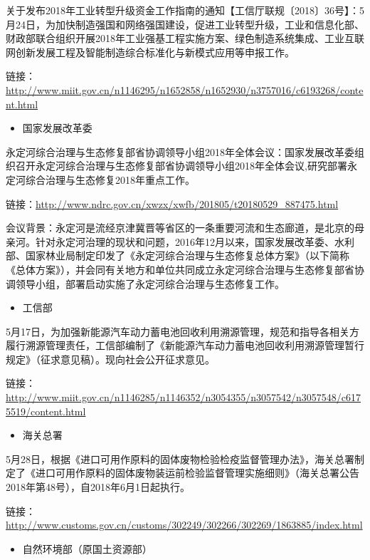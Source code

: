 \documentclass[]{book}
\providecommand{\tightlist}{%
  \setlength{\itemsep}{0pt}\setlength{\parskip}{0pt}}
\begin{document}
关于发布2018年工业转型升级资金工作指南的通知【工信厅联规〔2018〕36号】：5月24日，为加快制造强国和网络强国建设，促进工业转型升级，工业和信息化部、财政部联合组织开展2018年工业强基工程实施方案、绿色制造系统集成、工业互联网创新发展工程及智能制造综合标准化与新模式应用等申报工作。

链接：\url{http://www.miit.gov.cn/n1146295/n1652858/n1652930/n3757016/c6193268/content.html}

\begin{itemize}
\tightlist
\item
  国家发展改革委
\end{itemize}

永定河综合治理与生态修复部省协调领导小组2018年全体会议：国家发展改革委组织召开永定河综合治理与生态修复部省协调领导小组2018年全体会议,研究部署永定河综合治理与生态修复2018年重点工作。

链接：\url{http://www.ndrc.gov.cn/xwzx/xwfb/201805/t20180529_887475.html}

会议背景：永定河是流经京津冀晋等省区的一条重要河流和生态廊道，是北京的母亲河。针对永定河治理的现状和问题，2016年12月以来，国家发展改革委、水利部、国家林业局制定印发了《永定河综合治理与生态修复总体方案》（以下简称《总体方案》），并会同有关地方和单位共同成立永定河综合治理与生态修复部省协调领导小组，部署启动实施了永定河综合治理与生态修复工作。

\begin{itemize}
\tightlist
\item
  工信部
\end{itemize}

5月17日，为加强新能源汽车动力蓄电池回收利用溯源管理，规范和指导各相关方履行溯源管理责任，工信部编制了《新能源汽车动力蓄电池回收利用溯源管理暂行规定》（征求意见稿）。现向社会公开征求意见。

链接：\url{http://www.miit.gov.cn/n1146285/n1146352/n3054355/n3057542/n3057548/c6175519/content.html}

\begin{itemize}
\tightlist
\item
  海关总署
\end{itemize}

5月28日，根据《进口可用作原料的固体废物检验检疫监督管理办法》，海关总署制定了《进口可用作原料的固体废物装运前检验监督管理实施细则》（海关总署公告2018年第48号），自2018年6月1日起执行。

链接：\url{http://www.customs.gov.cn/customs/302249/302266/302269/1863885/index.html}

\begin{itemize}
\tightlist
\item
  自然环境部（原国土资源部）
\end{itemize}
\end{document}
